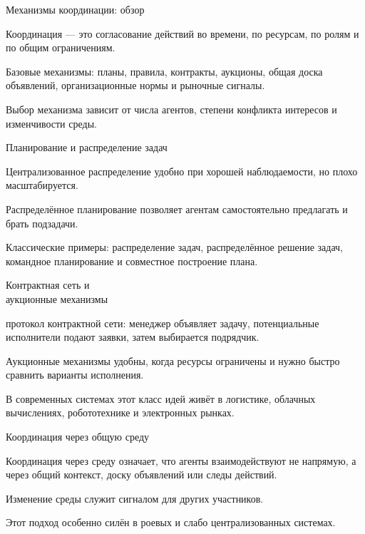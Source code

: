 \begin{frame}{Механизмы координации: обзор}
	\topline
	\justifying
	\begin{textitemize}
		\item Координация --- это согласование действий во времени, по ресурсам, по ролям и по общим ограничениям.
		\item Базовые механизмы: планы, правила, контракты, аукционы, общая доска объявлений, организационные нормы и рыночные сигналы.
		\item Выбор механизма зависит от числа агентов, степени конфликта интересов и изменчивости среды.
	\end{textitemize}
\end{frame}

\begin{frame}{Планирование и распределение задач}
	\topline
	\justifying
	\begin{textitemize}
		\item Централизованное распределение удобно при хорошей наблюдаемости, но плохо масштабируется.
		\item Распределённое планирование позволяет агентам самостоятельно предлагать и брать подзадачи.
		\item Классические примеры: распределение задач, распределённое решение задач, командное планирование и совместное построение плана.
	\end{textitemize}
\end{frame}

\begin{frame}{Контрактная сеть и\\ аукционные механизмы}
	\topline
	\justifying
	\begin{textitemize}
		\item протокол контрактной сети: менеджер объявляет задачу, потенциальные исполнители подают заявки, затем выбирается подрядчик.
		\item Аукционные механизмы удобны, когда ресурсы ограничены и нужно быстро сравнить варианты исполнения.
		\item В современных системах этот класс идей живёт в логистике, облачных вычислениях, робототехнике и электронных рынках.
	\end{textitemize}
\end{frame}

\begin{frame}{Координация через общую среду}
	\topline
	\justifying
	\begin{textitemize}
		\item Координация через среду означает, что агенты взаимодействуют не напрямую, а через общий контекст, доску объявлений или следы действий.
		\item Изменение среды служит сигналом для других участников.
		\item Этот подход особенно силён в роевых и слабо централизованных системах.
	\end{textitemize}
\end{frame}

